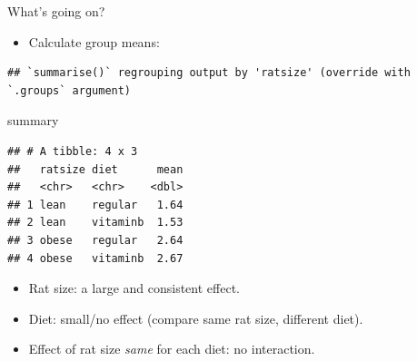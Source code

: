 \documentclass[
  ignorenonframetext,
]{beamer}
\newenvironment{Shaded}{\begin{snugshade}}{\end{snugshade}}
\newcommand{\DataTypeTok}[1]{\textcolor[rgb]{0.13,0.29,0.53}{#1}}
\newcommand{\KeywordTok}[1]{\textcolor[rgb]{0.13,0.29,0.53}{\textbf{#1}}}
\newcommand{\NormalTok}[1]{#1}
\newcommand{\OperatorTok}[1]{\textcolor[rgb]{0.81,0.36,0.00}{\textbf{#1}}}
\newcommand{\StringTok}[1]{\textcolor[rgb]{0.31,0.60,0.02}{#1}}
\providecommand{\tightlist}{%
  \setlength{\itemsep}{0pt}\setlength{\parskip}{0pt}}
\begin{document}
\begin{frame}[fragile]{What's going on?}
\protect\hypertarget{whats-going-on}{}

\begin{itemize}
\tightlist
\item
  Calculate group means:
\end{itemize}

\footnotesize

\begin{Shaded}
\end{Shaded}

\begin{verbatim}
## `summarise()` regrouping output by 'ratsize' (override with `.groups` argument)
\end{verbatim}

\begin{Shaded}
\begin{Highlighting}[]
\NormalTok{summary}
\end{Highlighting}
\end{Shaded}

\begin{verbatim}
## # A tibble: 4 x 3
##   ratsize diet      mean
##   <chr>   <chr>    <dbl>
## 1 lean    regular   1.64
## 2 lean    vitaminb  1.53
## 3 obese   regular   2.64
## 4 obese   vitaminb  2.67
\end{verbatim}

\normalsize

\begin{itemize}
\item
  Rat size: a large and consistent effect.
\item
  Diet: small/no effect (compare same rat size, different diet).
\item
  Effect of rat size \emph{same} for each diet: no interaction.
\end{itemize}

\end{frame}
\end{document}
